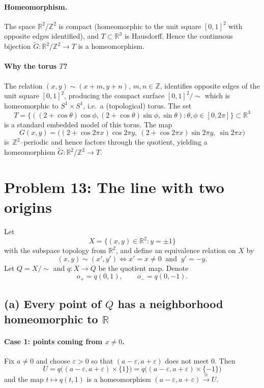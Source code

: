 \documentclass[12pt,a4paper]{article}
\theoremstyle{plain}
\theoremstyle{definition}
\theoremstyle{remark}
\theoremstyle{remark}
\begin{document}
	\paragraph{Homeomorphism.}
	The space $\mathbb{R}^2/\mathbb{Z}^2$ is compact (homeomorphic to the unit square $[0,1]^2$
	with opposite edges identified), and $T\subset\mathbb{R}^3$ is Hausdorff.
	Hence the continuous bijection $\tilde G:\mathbb{R}^2/\mathbb{Z}^2\to T$ is a homeomorphism.
	
	\paragraph{Why the torus $T$?}
	The relation $(x,y)\sim(x+m,y+n)$, $m,n\in\mathbb{Z}$, identifies opposite edges of the unit square
	$[0,1]^2$, producing the compact surface $[0,1]^2/\!\sim$ which is homeomorphic to $S^1\times S^1$,
	i.e.\ a (topological) torus. The set
	\[
	T=\{((2+\cos\theta)\cos\phi,(2+\cos\theta)\sin\phi,\sin\theta):\theta,\phi\in[0,2\pi]\}\subset\mathbb{R}^3
	\]
	is a standard embedded model of this torus. The map
	\[
	G(x,y)=\big((2+\cos 2\pi x)\cos 2\pi y,\ (2+\cos 2\pi x)\sin 2\pi y,\ \sin 2\pi x\big)
	\]
	is $\,\mathbb{Z}^2$–periodic and hence factors through the quotient, yielding a homeomorphism
	$\tilde G:\mathbb{R}^2/\mathbb{Z}^2\to T$.
	
	\section*{Problem 13: The line with two origins}
	
	Let
	\[
	X=\{(x,y)\in\mathbb{R}^2: y=\pm1\}
	\]
	with the subspace topology from $\mathbb{R}^2$, and define an equivalence relation on $X$ by
	\[
	(x,y)\sim(x',y') \iff x'=x\neq 0 \ \text{ and }\ y'=-y.
	\]
	Let $Q=X/\!\sim$ and $q:X\to Q$ be the quotient map. Denote
	\[
	o_+=q(0,1),\qquad o_-=q(0,-1).
	\]
	
	\subsection*{(a) Every point of $Q$ has a neighborhood homeomorphic to $\mathbb{R}$}
	\paragraph{Case 1: points coming from $x\neq0$.}
	Fix $a\neq0$ and choose $\varepsilon>0$ so that $(a-\varepsilon,a+\varepsilon)$ does not meet $0$.
	Then
	\[
	U = q\big((a-\varepsilon,a+\varepsilon)\times\{1\}\big)
	= q\big((a-\varepsilon,a+\varepsilon)\times\{-1\}\big)
	\]
	and the map $t\mapsto q(t,1)$ is a homeomorphism $(a-\varepsilon,a+\varepsilon)\xrightarrow{\cong} U$.
	
\end{document}
